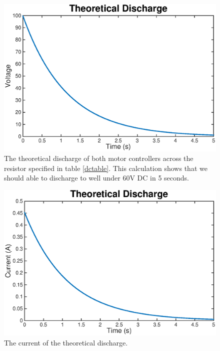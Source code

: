 \documentclass{article}
\begin{document}
            \begin{figure}[H]
                \centering
                \includegraphics[width = 0.8  \textwidth]{voltage.eps}
                \caption{The theoretical discharge of both motor controllers across the resistor specified in table \ref{dctable}. This calculation shows that we should able to discharge to well under 60V DC in 5 seconds.  }
                \label{discharge_volts}
            \end{figure}

            \begin{figure}[H]
                \centering
                \includegraphics[width = 0.8  \textwidth]{current.eps}
                \caption{The current of the theoretical discharge.}
                \label{discharge_amps}
            \end{figure}

\end{document}
